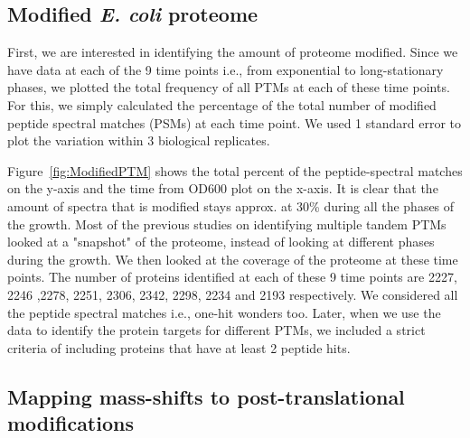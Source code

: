 \documentclass[12pt]{article}
\begin{document}

\subsection{Modified \emph{E. coli} proteome}
First, we are interested in identifying the amount of proteome modified. Since we have data at each of the 9 time points i.e., from exponential to long-stationary phases, we plotted the total frequency of all PTMs at each of these time points. For this, we simply calculated the percentage of the total number of modified peptide spectral matches (PSMs) at each time point. We used 1 standard error to plot the variation within 3 biological replicates.

Figure~\ref{fig:ModifiedPTM} shows the total percent of the peptide-spectral matches on the y-axis and the time from OD600 plot on the x-axis. It is clear that the amount of spectra that is modified stays approx. at 30\% during all the phases of the growth. Most of the previous studies on identifying multiple tandem PTMs looked at a "snapshot" of the proteome, instead of looking at different phases during the growth. We then looked at the coverage of the proteome at these time points. The number of proteins identified at each of these 9 time points are 2227, 2246
,2278, 2251, 2306, 2342, 2298, 2234 and 2193 respectively. We considered all the peptide spectral matches i.e., one-hit wonders too. Later, when we use the data to identify the protein targets for different PTMs, we included a strict criteria of including proteins that have at least 2 peptide hits.

\subsection{Mapping mass-shifts to post-translational modifications}
\end{document}
